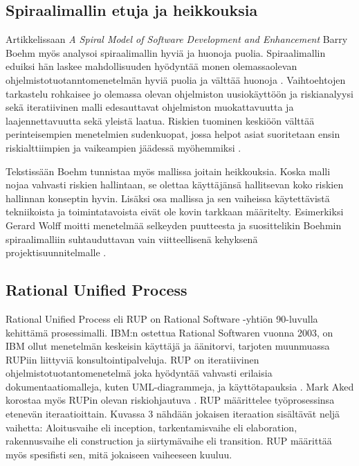 \documentclass[finnish,12pt]{tktltiki2}
\theoremstyle{definition}
\theoremstyle{remark}
\begin{document}
\subsection{Spiraalimallin etuja ja heikkouksia}

Artikkelissaan \textit{A Spiral Model of Software Development and Enhancement} \cite{Boehm:1988:SMS:45797.45801} Barry Boehm myös analysoi spiraalimallin hyviä ja huonoja puolia. Spiraalimallin eduiksi hän laskee mahdollisuuden hyödyntää monen olemassaolevan ohjelmistotuotanntomenetelmän hyviä puolia ja välttää huonoja \cite{Boehm:1988:SMS:45797.45801}. Vaihtoehtojen tarkastelu rohkaisee jo olemassa olevan ohjelmiston uusiokäyttöön ja riskianalyysi sekä iteratiivinen malli edesauttavat ohjelmiston muokattavuutta ja laajennettavuutta sekä yleistä laatua. Riskien tuominen keskiöön välttää perinteisempien menetelmien sudenkuopat, jossa helpot asiat suoritetaan ensin riskialttiimpien ja vaikeampien jäädessä myöhemmiksi \cite{Wolff:1989:MRS:107446.107478}. 

Tekstissään Boehm tunnistaa myös mallissa joitain heikkouksia. Koska malli nojaa vahvasti riskien hallintaan, se olettaa käyttäjänsä hallitsevan koko riskien hallinnan konseptin hyvin\cite{Boehm:1988:SMS:45797.45801}. Lisäksi osa mallissa ja sen vaiheissa käytettävistä tekniikoista ja toimintatavoista eivät ole kovin tarkkaan määritelty. Esimerkiksi Gerard Wolff moitti menetelmää selkeyden puutteesta ja suosittelikin Boehmin spiraalimalliin suhtauduttavan vain viitteellisenä kehyksenä projektisuunnitelmalle \cite{Wolff:1989:MRS:107446.107478}. 

 
\subsection{Rational Unified Process}

Rational Unified Process eli RUP on Rational Software -yhtiön 90-luvulla kehittämä prosessimalli. IBM:n ostettua Rational Softwaren vuonna 2003, on IBM ollut menetelmän keskeisin käyttäjä ja äänitorvi, tarjoten muunmuassa RUPiin liittyviä konsultointipalveluja. 
RUP on iteratiivinen ohjelmistotuotantomenetelmä joka hyödyntää vahvasti erilaisia dokumentaatiomalleja, kuten UML-diagrammeja, ja käyttötapauksia \cite{Ruparelia:2010:SDL:1764810.1764814}. Mark Aked korostaa myös RUPin olevan riskiohjautuva \cite{Aked03}.
RUP määrittelee työprosessinsa etenevän iteraatioittain. Kuvassa 3 nähdään jokaisen iteraation sisältävät neljä vaihetta: Aloitusvaihe eli inception, tarkentamisvaihe eli elaboration, rakennusvaihe eli construction ja siirtymävaihe eli transition. RUP määrittää myös spesifisti sen, mitä jokaiseen vaiheeseen kuuluu. 
\end{document}

